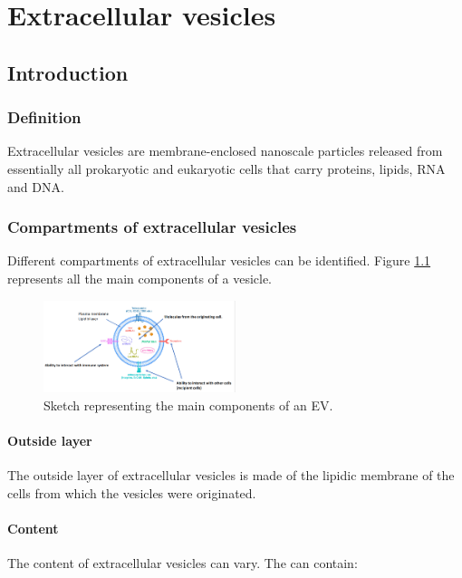 \graphicspath{{chapters/notes/09/images/}}
\chapter{Extracellular vesicles}

\section{Introduction}

    \subsection{Definition}
    Extracellular vesicles are membrane-enclosed nanoscale particles released from essentially all prokaryotic and eukaryotic cells that carry proteins, lipids, RNA and DNA.

    \subsection{Compartments of extracellular vesicles}
    Different compartments of extracellular vesicles can be identified.
    Figure \ref{fig:ev1} represents all the main components of a vesicle.

    \begin{figure}[H]
        \centering
        \includegraphics[width=0.5\textwidth]{ev1.png}
        \caption{Sketch representing the main components of an EV.}
        \label{fig:ev1}
    \end{figure}

        \subsubsection{Outside layer}
        The outside layer of extracellular vesicles is made of the lipidic membrane of the cells from which the vesicles were originated.

        \subsubsection{Content}
        The content of extracellular vesicles can vary.
        The can contain:

